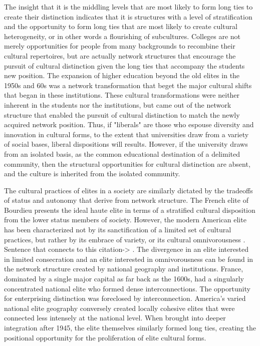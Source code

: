\documentclass[12pt]{article}
\begin{document}
The insight that it is the middling levels that are most likely to form long ties to create their distinction indicates that it is structures with a level of stratification and the opportunity to form long ties that are most likely to create cultural heterogeneity, or in other words a flourishing of subcultures. Colleges are not merely opportunities for people from many backgrounds to recombine their cultural repertoires, but are actually network structures that encourage the pursuit of cultural distinction given the long ties that accompany the students new position. The expansion of higher education beyond the old elites in the 1950s and 60s was a network transformation that beget the major cultural shifts that began in these institutions. These cultural transformations were neither inherent in the students nor the institutions, but came out of the network structure that enabled the pursuit of cultural distinction to match the newly acquired network position. Thus, if "liberals" are those who espouse diversity and innovation in cultural forms, to the extent that universities draw from a variety of social bases, liberal dispositions will results. However, if the university draws from an isolated basis, as the common educational destination of a delimited community, then the structural opportunities for cultural distinction are absent, and the culture is inherited from the isolated community.   

The cultural practices of elites in a society are similarly dictated by the tradeoffs of status and autonomy that derive from network structure. The French elite of Bourdieu presents the ideal haute elite in terms of a stratified cultural disposition from the lower status members of society. However, the modern American elite has been characterized not by its sanctification of a limited set of cultural practices, but rather by its embrace of variety, or its cultural omnivorousness \citep{bryson1996anything}. Sentence that connects to this citation-> \citep{lizardo2014omnivorousness}. The divergence in an elite interested in limited consecration and an elite interested in omnivorousness can be found in the network structure created by national geography and institutions. France, dominated by a single major capital as far back as the 1600s, had a singularly concentrated national elite who formed dense interconnections. The opportunity for enterprising distinction was foreclosed by interconnection. America's varied national elite geography conversely created locally cohesive elites that were connected less intensely at the national level. When brought into deeper integration after 1945, the elite themselves similarly formed long ties, creating the positional opportunity for the proliferation of elite cultural forms.      
\end{document}
